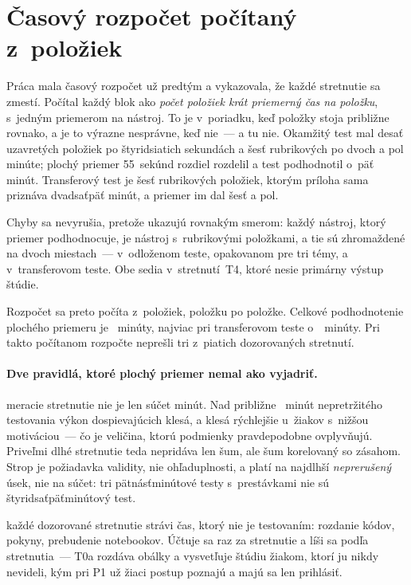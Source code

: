 \section{Časový rozpočet počítaný z~položiek}
\label{sec:cas-rozpocet}

Práca mala časový rozpočet už predtým a vykazovala, že každé stretnutie sa
zmestí. Počítal každý blok ako \emph{počet položiek krát priemerný čas na
položku}, s~jedným priemerom na nástroj. To je v~poriadku, keď položky stoja
približne rovnako, a je to výrazne nesprávne, keď nie~--- a tu nie. Okamžitý test
mal desať uzavretých položiek po štyridsiatich sekundách a šesť rubrikových po
dvoch a pol minúte; plochý priemer 55~sekúnd rozdiel rozdelil a test podhodnotil
o~päť minút. Transferový test je šesť rubrikových položiek, ktorým príloha sama
priznáva dvadsaťpäť minút, a priemer im dal šesť a pol.

Chyby sa nevyrušia, pretože ukazujú rovnakým smerom: každý nástroj, ktorý priemer
podhodnocuje, je nástroj s~rubrikovými položkami, a tie sú zhromaždené na dvoch
miestach~--- v~odloženom teste, opakovanom pre tri témy, a v~transferovom teste.
Obe sedia v~stretnutí~T4, ktoré nesie primárny výstup štúdie.

Rozpočet sa preto počíta z~položiek, položku po položke. Celkové podhodnotenie
plochého priemeru je \asmBudgetUnderstated{}~minúty, najviac pri transferovom
teste o~\asmBudgetWorstBy{}~minúty. Pri takto počítanom rozpočte neprešli tri
z~piatich dozorovaných stretnutí.

\paragraph{Dve pravidlá, ktoré plochý priemer nemal ako vyjadriť.}

\begin{description}[leftmargin=0.6cm, nosep]
    \item[\textbf{Únavový strop}] meracie stretnutie nie je len súčet minút. Nad
          približne \instrFatigueCap{}~minút nepretržitého testovania výkon
          dospievajúcich klesá, a klesá rýchlejšie u~žiakov s~nižšou motiváciou~---
          čo je veličina, ktorú podmienky pravdepodobne ovplyvňujú. Priveľmi dlhé
          stretnutie teda nepridáva len šum, ale šum korelovaný so zásahom.
          Strop je požiadavka validity, nie ohľaduplnosti, a platí na najdlhší
          \emph{neprerušený} úsek, nie na súčet: tri pätnásťminútové testy
          s~prestávkami nie sú štyridsaťpäťminútový test.
    \item[\textbf{Náklad odovzdania}] každé dozorované stretnutie strávi čas,
          ktorý nie je testovaním: rozdanie kódov, pokyny, prebudenie notebookov.
          Účtuje sa raz za stretnutie a líši sa podľa stretnutia~--- T0a rozdáva
          obálky a vysvetľuje štúdiu žiakom, ktorí ju nikdy nevideli, kým pri P1
          už žiaci postup poznajú a majú sa len prihlásiť.
\end{description}

